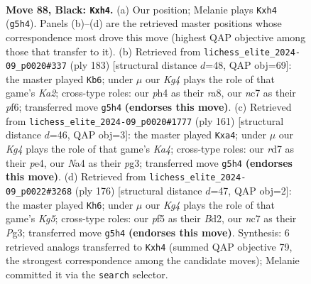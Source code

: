 \documentclass[11pt]{article}
\begin{document}
\clearpage

\begin{figure}[p]\centering
\begin{subfigure}{0.46\textwidth}\centering
\resizebox{\linewidth}{!}{%
\newchessgame
\chessboard[
  setfen={8/2NR4/2b5/5Pk1/np4PP/8/8/5BK1 b - - 0 88},
  showmover=false,
  pgfstyle=straightmove, color=movearrow, markmove={g5-h4}
]}
\caption{}
\end{subfigure}\hfill
\begin{subfigure}{0.46\textwidth}\centering
\resizebox{\linewidth}{!}{%
\newchessgame
\chessboard[
  setfen={R7/kP3K2/P4P2/1r6/8/8/8/8 b - - 6 92},
  showmover=false,
  pgfstyle=straightmove, color=movearrow, markmove={a7-b6}
]}
\caption{}
\end{subfigure}
\\[4pt]
\begin{subfigure}{0.46\textwidth}\centering
\resizebox{\linewidth}{!}{%
\newchessgame
\chessboard[
  setfen={4b3/2p5/8/kPK1N1p1/P3P3/6P1/8/8 b - - 0 81},
  showmover=false,
  pgfstyle=straightmove, color=movearrow, markmove={a5-a4}
]}
\caption{}
\end{subfigure}\hfill
\begin{subfigure}{0.46\textwidth}\centering
\resizebox{\linewidth}{!}{%
\newchessgame
\chessboard[
  setfen={2b5/2P2k2/6p1/6Kp/4P3/6P1/3B4/8 w - - 29 89},
  showmover=false,
  pgfstyle=straightmove, color=movearrow, markmove={g5-h6}
]}
\caption{}
\end{subfigure}
\caption{\textbf{Move 88, Black: \texttt{Kxh4}.} (a) Our position; Melanie plays \texttt{Kxh4} (\texttt{g5h4}). Panels (b)--(d) are the retrieved master positions whose correspondence most drove this move (highest QAP objective among those that transfer to it). (b) Retrieved from \texttt{lichess\_elite\_2024-09\_p0020\#337} (ply 183) [structural distance $d$=48, QAP obj=69]: the master played \texttt{Kb6}; under $\mu$ our \emph{Kg4} plays the role of that game's \emph{Ka2}; cross-type roles: our \emph{p}h4 as their \emph{r}a8, our \emph{n}c7 as their \emph{p}f6; transferred move \texttt{g5h4} \textbf{(endorses this move)}. (c) Retrieved from \texttt{lichess\_elite\_2024-09\_p0020\#1777} (ply 161) [structural distance $d$=46, QAP obj=3]: the master played \texttt{Kxa4}; under $\mu$ our \emph{Kg4} plays the role of that game's \emph{Ka4}; cross-type roles: our \emph{r}d7 as their \emph{p}e4, our \emph{N}a4 as their \emph{p}g3; transferred move \texttt{g5h4} \textbf{(endorses this move)}. (d) Retrieved from \texttt{lichess\_elite\_2024-09\_p0022\#3268} (ply 176) [structural distance $d$=47, QAP obj=2]: the master played \texttt{Kh6}; under $\mu$ our \emph{Kg4} plays the role of that game's \emph{Kg5}; cross-type roles: our \emph{p}f5 as their \emph{B}d2, our \emph{n}c7 as their \emph{P}g3; transferred move \texttt{g5h4} \textbf{(endorses this move)}. Synthesis: 6 retrieved analogs transferred to \texttt{Kxh4} (summed QAP objective 79, the strongest correspondence among the candidate moves); Melanie committed it via the \texttt{search} selector.}
\label{fig:thought-m175}
\end{figure}
\end{document}
